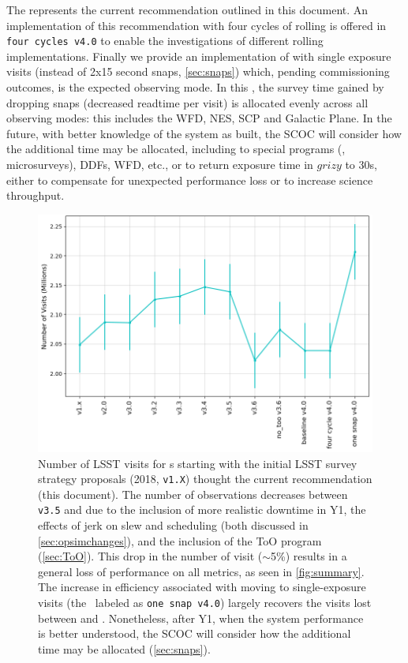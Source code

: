  The  represents the current recommendation outlined in this document. An implementation of this recommendation with four cycles of rolling is offered in \texttt{four cycles v4.0} to enable the investigations of different rolling implementations. Finally we provide an implementation of  with single exposure visits (instead of 2x15 second snaps, \autoref{sec:snaps}) which, pending commissioning outcomes, is the expected observing mode. In this \opsim, the survey time gained by dropping snaps (decreased readtime per visit) is allocated evenly across all observing modes: this includes the WFD, NES, SCP and Galactic Plane. In the future, with better knowledge of the system as built, the SCOC will consider how the additional time may be allocated, including to special programs (\eg, microsurveys), DDFs, WFD, etc., or to return exposure time in $grizy$ to 30s, either to compensate for unexpected performance loss or to increase science throughput.
\begin{figure}
    \centering
    \includegraphics[width=0.7\linewidth]{figures/total_nvisits.png}
    \caption{Number of LSST visits for \opsim s starting with the initial LSST survey strategy proposals (2018, \texttt{v1.X}) thought the current recommendation (this document). The number of observations decreases between \texttt{v3.5} and  due to the inclusion of more realistic downtime in Y1, the effects of jerk on slew and scheduling (both discussed in \autoref{sec:opsimchanges}), and the inclusion of the ToO program (\autoref{sec:ToO}). This drop in the number of visit ($\sim$5\%) results in a general loss of performance on all metrics, as seen in \autoref{fig:summary}. The increase in efficiency associated with moving to single-exposure visits (the \opsim\ labeled as \texttt{one snap v4.0}) largely recovers the visits lost between  and . Nonetheless, after Y1, when the system performance is better understood, the SCOC will consider how the additional time may be allocated (\autoref{sec:snaps}). }
    \label{fig:nvisits}
\end{figure}

